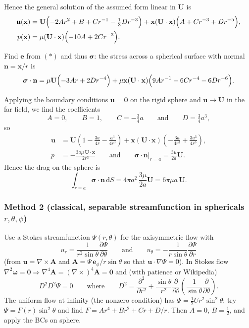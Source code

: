 \documentclass{article}
\begin{document}
Hence the general solution of the assumed form linear in $\mathbf{U}$ is
\begin{align*}
  \mathbf{u}(\mathbf{x}) &= \mathbf{U}\Bigl( -2Ar^2 + B + Cr^{-1} - \tfrac{1}{3} D r^{-3} \Bigr)
    + \mathbf{x}(\mathbf{U}\cdot\mathbf{x})\Bigl( A + Cr^{-3} + Dr^{-5} \Bigr), \\
  p(\mathbf{x}) &= \mu(\mathbf{U}\cdot\mathbf{x})\Bigl( -10A + 2Cr^{-3} \Bigr).
\end{align*}

Find $\mathbf{e}$ from $(*)$ and thus $\boldsymbol{\sigma}$: the stress across a spherical surface with normal $\mathbf{n} = \mathbf{x}/r$ is
\[
  \boldsymbol{\sigma}\cdot\mathbf{n}
  = \mu\mathbf{U}\Bigl( -3Ar + 2Dr^{-4} \Bigr)
  + \mu\mathbf{x}(\mathbf{U}\cdot\mathbf{x})\Bigl( 9Ar^{-1} - 6Cr^{-4} - 6Dr^{-6} \Bigr).
\]

Applying the boundary conditions $\mathbf{u} = \mathbf{0}$ on the rigid sphere and $\mathbf{u} \to \mathbf{U}$ in the far field, we find the coefficients
\[
  A = 0, \qquad B = 1, \qquad C = -\tfrac{3}{4}a \qquad\text{and}\qquad D = \tfrac{3}{4}a^3,
\]
so
\begin{align*}
  \mathbf{u} &= \mathbf{U}\left( 1 - \frac{3a}{4r} - \frac{a^3}{4r^3} \right)
    + \mathbf{x}(\mathbf{U}\cdot\mathbf{x})\left( -\frac{3a}{4r^3} + \frac{3a^3}{4r^5} \right), \\
  p &= -\frac{3a\mu\, \mathbf{U}\cdot\mathbf{x}}{2r^3}
  \qquad\text{and}\qquad
  \boldsymbol{\sigma}\cdot\mathbf{n}\Big|_{r=a} = \frac{3\mu}{2a}\mathbf{U}.
\end{align*}
Hence the drag on the sphere is
\[
  \int_{r=a} \boldsymbol{\sigma}\cdot\mathbf{n}\, \mathrm{d}S
  = 4\pi a^2 \,\frac{3\mu}{2a}\mathbf{U} = 6\pi\mu a\,\mathbf{U}.
\]

\subsubsection{Method 2 (classical, separable streamfunction in sphericals $r, \theta, \phi$)}

Use a Stokes streamfunction $\Psi(r,\theta)$ for the axisymmetric flow with
\[
  u_r = \frac{1}{r^2 \sin\theta}\frac{\partial\Psi}{\partial\theta}
  \qquad\text{and}\qquad
  u_\theta = -\frac{1}{r\sin\theta}\frac{\partial\Psi}{\partial r}
\]
(from $\mathbf{u} = \nabla\times\mathbf{A}$ and $\mathbf{A} = \Psi\,\mathbf{e}_\phi / r\sin\theta$ so that $\mathbf{u}\cdot\nabla\Psi = 0$). In Stokes flow $\nabla^2\boldsymbol{\omega} = \mathbf{0} \Rightarrow \nabla^4\mathbf{A} = (\nabla\times)^4\mathbf{A} = \mathbf{0}$ and (with patience or Wikipedia)
\[
  D^2 D^2 \Psi = 0
  \qquad\text{where}\qquad
  D^2 = \frac{\partial^2}{\partial r^2} + \frac{\sin\theta}{r^2}\frac{\partial}{\partial\theta}\left( \frac{1}{\sin\theta}\frac{\partial}{\partial\theta} \right).
\]
The uniform flow at infinity (the nonzero condition) has $\Psi = \tfrac{1}{2}Ur^2\sin^2\theta$; try $\Psi = F(r)\sin^2\theta$ and find $F = Ar^4 + Br^2 + Cr + D/r$. Then $A = 0$, $B = \tfrac{1}{2}$, and apply the BCs on sphere.
\end{document}
